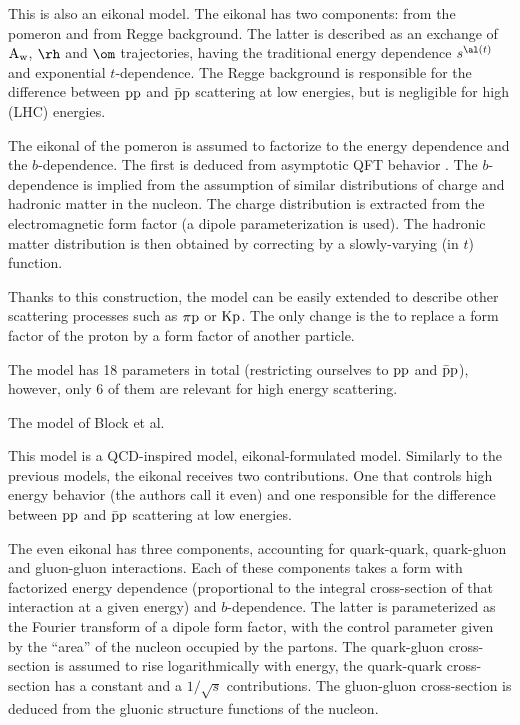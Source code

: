 This is also an eikonal model. The eikonal has two components: from the pomeron and from Regge background. The latter is described as an exchange of $\rm A_w$, $\rm \rh$ and $\rm \om$ trajectories, having the traditional energy dependence $s^{\al(t)}$ and exponential $t$-dependence. The Regge background is responsible for the difference between $\rm pp$ and $\rm\bar pp$ scattering at low energies, but is negligible for high (LHC) energies.

The eikonal of the pomeron is assumed to factorize to the energy dependence and the $b$-dependence. The first is deduced from asymptotic QFT behavior . The $b$-dependence is implied from the assumption of similar distributions of charge and hadronic matter in the nucleon. The charge distribution is extracted from the electromagnetic form factor (a dipole parameterization is used). The hadronic matter distribution is then obtained by correcting by a slowly-varying (in $t$) function.

Thanks to this construction, the model can be easily extended to describe other scattering processes such as $\rm \pi p$ or $\rm Kp$. The only change is the to replace a form factor of the proton by a form factor of another particle.

The model has 18 parameters in total (restricting ourselves to $\rm pp$ and $\rm \bar p p$), however, only 6 of them are relevant for high energy scattering.

\caption{The model of Block et al. }

This model is a QCD-inspired model, eikonal-formulated model. Similarly to the previous models, the eikonal receives two contributions. One that controls high energy behavior (the authors call it even) and one responsible for the difference between $\rm pp$ and $\rm\bar pp$ scattering at low energies.

The even eikonal has three components, accounting for quark-quark, quark-gluon and gluon-gluon interactions. Each of these components takes a form with factorized energy dependence (proportional to the integral cross-section of that interaction at a given energy) and $b$-dependence. The latter is parameterized as the Fourier transform of a dipole form factor, with the control parameter given by the ``area'' of the nucleon occupied by the partons. The quark-gluon cross-section is assumed to rise logarithmically with energy, the quark-quark cross-section has a constant and a $1/\sqrt s$ contributions. The gluon-gluon cross-section is deduced from the gluonic structure functions of the nucleon.


